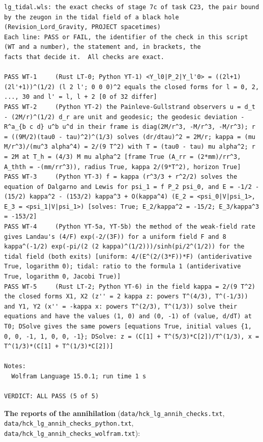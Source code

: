 \documentclass[
  10pt,
]{article}
\begin{document}
\begin{verbatim}
lg_tidal.wls: the exact checks of stage 7c of task C23, the pair bound by the zeugon in the tidal field of a black hole (Revision_Lord_Gravity, PROJECT spacetimes)
Each line: PASS or FAIL, the identifier of the check in this script (WT and a number), the statement and, in brackets, the
facts that decide it.  All checks are exact.

PASS WT-1     (Rust LT-0; Python YT-1) <Y_l0|P_2|Y_l'0> = ((2l+1)(2l'+1))^(1/2) (l 2 l'; 0 0 0)^2 equals the closed forms for l = 0, 2, ..., 30 and l' = l, l + 2 [0 of 32 differ]
PASS WT-2     (Python YT-2) the Painleve-Gullstrand observers u = d_t - (2M/r)^(1/2) d_r are unit and geodesic; the geodesic deviation -R^a_{b c d} u^b u^d in their frame is diag(2M/r^3, -M/r^3, -M/r^3); r = ((9M/2)(tau0 - tau)^2)^(1/3) solves (dr/dtau)^2 = 2M/r; kappa = (mu M/r^3)/(mu^3 alpha^4) = 2/(9 T^2) with T = (tau0 - tau) mu alpha^2; r = 2M at T_h = (4/3) M mu alpha^2 [frame True (A_rr = (2*mm)/rr^3, A_thth = -(mm/rr^3)), radius True, kappa 2/(9*T^2), horizon True]
PASS WT-3     (Python YT-3) f = kappa (r^3/3 + r^2/2) solves the equation of Dalgarno and Lewis for psi_1 = f P_2 psi_0, and E = -1/2 - (15/2) kappa^2 - (153/2) kappa^3 + O(kappa^4) (E_2 = <psi_0|V|psi_1>, E_3 = <psi_1|V|psi_1>) [solves: True; E_2/kappa^2 = -15/2; E_3/kappa^3 = -153/2]
PASS WT-4     (Python YT-5a, YT-5b) the method of the weak-field rate gives Landau's (4/F) exp(-2/(3F)) for a uniform field F and 8 kappa^(-1/2) exp(-pi/(2 (2 kappa)^(1/2)))/sinh(pi/2^(1/2)) for the tidal field (both exits) [uniform: 4/(E^(2/(3*F))*F) (antiderivative True, logarithm 0); tidal: ratio to the formula 1 (antiderivative True, logarithm 0, Jacobi True)]
PASS WT-5     (Rust LT-2; Python YT-6) in the field kappa = 2/(9 T^2) the closed forms X1, X2 (z'' = 2 kappa z: powers T^(4/3), T^(-1/3)) and Y1, Y2 (x'' = -kappa x: powers T^(2/3), T^(1/3)) solve their equations and have the values (1, 0) and (0, -1) of (value, d/dT) at T0; DSolve gives the same powers [equations True, initial values {1, 0, 0, -1, 1, 0, 0, -1}; DSolve: z = (C[1] + T^(5/3)*C[2])/T^(1/3), x = T^(1/3)*(C[1] + T^(1/3)*C[2])]

Notes:
  Wolfram Language 15.0.1; run time 1 s

VERDICT: ALL PASS (5 of 5)
\end{verbatim}

\textbf{The reports of the annihilation}
(\texttt{data/hck\_lg\_annih\_checks.txt},
\texttt{data/hck\_lg\_annih\_checks\_python.txt},
\texttt{data/hck\_lg\_annih\_checks\_wolfram.txt}):
\end{document}
